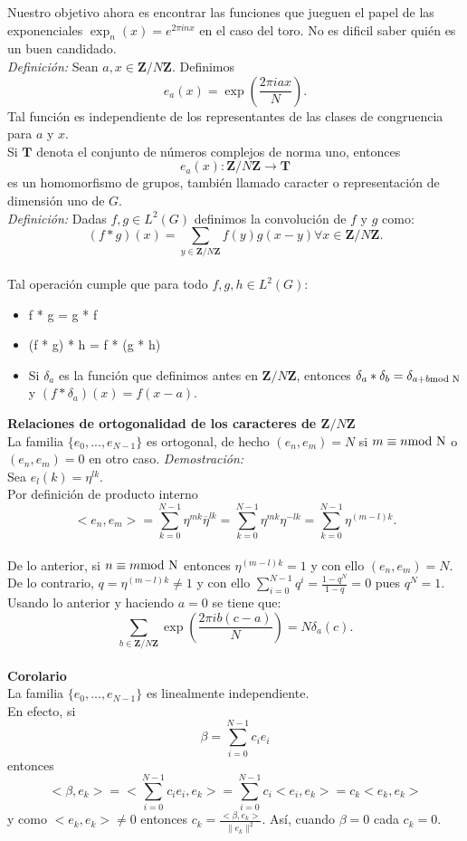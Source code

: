 \documentclass[a4paper,openright,10pt]{article}
\begin{document}
Nuestro objetivo ahora es encontrar las funciones que jueguen el papel de las exponenciales $\exp_{n}(x)=e^{2\pi inx}$ en el caso del toro. No es dificil saber qui\'en es un buen candidado.\\
\textsl{Definici\'on:} Sean $a, x \in \mathbf{Z}/N\mathbf{Z}.$ Definimos $$
e_{a}(x)=\exp(\frac{2\pi iax}{N}).
$$ Tal funci\'on es independiente de los representantes de las clases de congruencia para $a$ y $x.$\\
Si $\mathbf{T}$ denota el conjunto de n\'umeros complejos de norma uno, entonces $$
e_{a}(x): \mathbf{Z}/N\mathbf{Z} \rightarrow \mathbf{T}
$$ es un homomorfismo de grupos, tambi\'en llamado caracter o representaci\'on de dimensi\'on uno de $G.$\\
\textsl{Definici\'on:} Dadas $f,g \in L^{2}(G)$ definimos la convoluci\'on de $f$ y $g$ como: $$
(f*g)(x) = \sum \limits _{y \in \mathbf{Z}/N\mathbf{Z}} f(y)g(x-y)
\forall x \in \mathbf{Z}/N\mathbf{Z}.$$\\
Tal operaci\'on cumple que para todo $f,g,h \in L^{2}(G)$: 
\begin{itemize}
	\item f * g = g * f
    \item (f * g) * h = f * (g * h)
    \item  Si $\delta_{a}$ es la funci\'on que definimos antes en $\mathbf{Z}/N\mathbf{Z}$, entonces $\delta_{a}*\delta_{b}=\delta_{a+b \textnormal{mod N}}$ y $(f*\delta_{a})(x)=f(x-a).$ 
 \end{itemize}
\textbf{Relaciones de ortogonalidad de los caracteres de $\mathbf{Z}/N\mathbf{Z}$}\\
La familia $\{e_{0},...,e_{N-1}\}$ es ortogonal, de hecho $(e_{n}, e_{m})= N$ si $m\equiv n \textnormal{mod N}$ o $(e_{n}, e_{m})= 0$ en otro caso. 
\textsl{Demostraci\'on:}\\
Sea $e_{l}(k)=\eta ^{lk} .$\\
Por definici\'on de producto interno $$
<e_{n}, e_{m}> 
=\sum\limits_{k=0}^{N-1} \eta ^{mk} \overline \eta ^{lk}
=\sum\limits_{k=0}^{N-1} \eta ^{mk} \eta ^ {-lk}
=\sum\limits_{k=0}^{N-1} \eta ^{(m-l)k}.
$$\\
De lo anterior, si $n\equiv m\textnormal{mod N}$ entonces $\eta ^{(m-l)k}=1$ y con ello $(e_{n}, e_{m})= N$. De lo contrario, $q=\eta ^{(m-l)k}\neq 1$ y con ello $\sum\limits_{i=0}^{N-1} q^{i} = \frac{1-q^{N}}{1-q} =0$ pues $q^{N}=1.$\\
Usando lo anterior y haciendo $a=0$ se tiene que: $$\sum\limits_{b\in \mathbf{Z}/N\mathbf{Z}} \exp(\frac{2\pi ib(c-a)}{N})=N\delta_{a}(c).$$\\  
\textbf{Corolario}\\ 
La familia $\{e_{0},...,e_{N-1}\}$ es linealmente independiente.\\
En efecto, si $$
\beta = \sum\limits_{i=0}^{N-1} c_{i} e_{i}$$ 
entonces 
$$
<\beta, e_{k}> = <\sum\limits_{i=0}^{N-1} c_{i} e_{i}, e_{k}>
= \sum\limits_{i=0}^{N-1} c_{i} <e_{i}, e_{k}>
=c_{k} <e_{k}, e_{k}>
$$ y como $<e_{k}, e_{k}> \neq 0$ entonces $c_{k}=\frac{<\beta, e_{k}>}{\parallel e_{k} \parallel ^{2}}.$ As\'i, cuando $\beta=0$ cada $c_{k}=0$.\\
\end{document}
